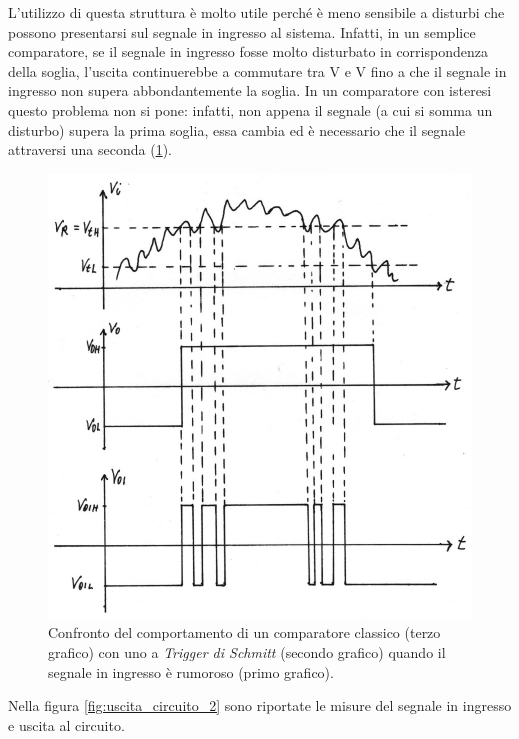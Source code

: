 \noindent
L'utilizzo di questa struttura è molto utile perché è meno sensibile a disturbi che possono presentarsi sul segnale in ingresso al sistema. Infatti, in un semplice comparatore, se il segnale in ingresso fosse molto disturbato in corrispondenza della soglia, l'uscita continuerebbe a commutare tra V e V fino a che il segnale in ingresso non supera abbondantemente la soglia. In un comparatore con isteresi questo problema non si pone: infatti, non appena il segnale (a cui si somma un disturbo) supera la prima soglia, essa cambia ed è necessario che il segnale attraversi una seconda (\Fig\ref{fig:trigger_di_shmitt_vantaggi}).

\begin{figure}[h!]
	\centering
	\includegraphics[width=0.8\linewidth]{./ImageFiles/Laboratorio 3/Usicta Rumorosa e Trigger di Shmitt.jpg}
	\caption{Confronto del comportamento di un comparatore classico (terzo grafico) con uno a \textit{Trigger di Schmitt} (secondo grafico) quando il segnale in ingresso è rumoroso (primo grafico).}
	\label{fig:trigger_di_shmitt_vantaggi}
\end{figure} 
Nella figura \ref{fig:uscita_circuito_2} sono riportate le misure del segnale in ingresso e uscita al circuito.
